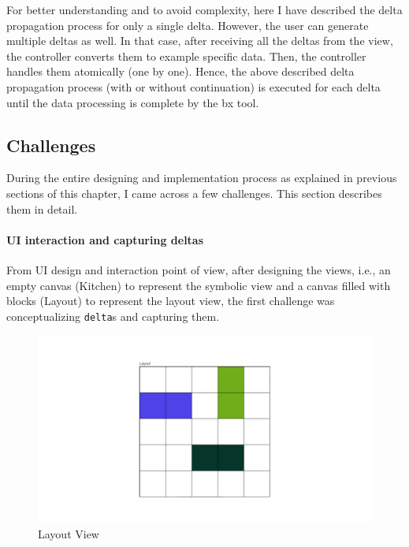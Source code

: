 For better understanding and to avoid complexity, here I have described the delta propagation process for only a single delta. However, the user can generate multiple deltas as well. In that case, after receiving all the deltas from the view, the controller converts them to example specific data. Then, the controller handles them atomically (one by one). Hence, the above described delta propagation process (with or without continuation) is executed for each delta until the data processing is complete by the bx tool.

\subsection{Challenges}\label{subsec:designchallenges}
During the entire designing and implementation process as explained in previous sections of this chapter, I came across a few challenges. This section describes them in detail. 

\paragraph{UI interaction and capturing deltas}
From UI design and interaction point of view, after designing the views, i.e., an empty canvas (Kitchen) to represent the symbolic view and a canvas filled with blocks (Layout) to represent the layout view, the first challenge was conceptualizing \texttt{delta}s and capturing them. 

\begin{figure}[h]
	\includegraphics[width=1\textwidth]{figures/layout}
	\caption{Layout View}
	\label{fig:Layout}
\end{figure}


